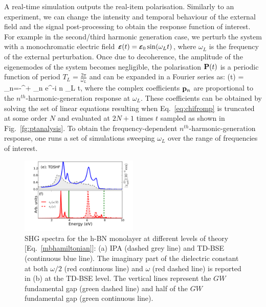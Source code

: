 A real-time simulation outputs the real-item polarisation. Similarly to an experiment, we can change the intensity and temporal behaviour of the external field and the signal post-processing to obtain the response function of interest.      
For example in the second/third harmonic generation case, we perturb the system with a monochromatic electric field $\boldsymbol{\scriptstyle \cal E}(t) = \boldsymbol{\scriptstyle \cal E}_0 \sin(\omega_L t)$, where $\omega_L$ is the frequency of the external perturbation. Once due to decoherence, the amplitude of the eigenemodes of the system becomes negligible, the polarisation ${\bf P}(t)$ is a periodic function of period $T_L =\frac{2\pi}{\omega_L}$ and can be expanded in a Fourier series as:
\be
\PP(t) = \sum_{n=-\infty}^{+\infty} \pp_n e^{-i n \omega_L t}, 
\label{eq:chifromp}
\ee
 where the complex coefficients ${\bf p}_n$ are proportional to the $n^{th}$-harmonic-generation response at $\omega_L$. These coefficients can be obtained by solving the set of linear equations resulting when Eq.~\ref{eq:chifromp} is truncated at some order $N$ and evaluated at $2N+1$ times $t$ sampled as shown in Fig.~\ref{fg:ptanalysis}.  %
To obtain the frequency-dependent  $n^{th}$-harmonic-generation response, one runs a set of simulations sweeping $\omega_L$ over the range of frequencies of interest. 
 
\begin{figure}
    \centering
\includegraphics[width=0.5\textwidth]{Figures/eps_and_X2_short}
	\caption{\footnotesize{SHG spectra for the h-BN monolayer at different levels of theory [Eq.~\eqref{mbhamiltonian}]: (a) IPA (dashed grey line) and TD-BSE (continuous blue line). The imaginary part of the dielectric constant at both $\omega/2$ (red continuous line) and $\omega$ (red dashed line) is reported in (b) at the  TD-BSE level. The vertical lines represent the $GW$ fundamental gap (green dashed line) and half of the $GW$ fundamental gap (green continuous line). \label{X2bn} }}
\end{figure}


